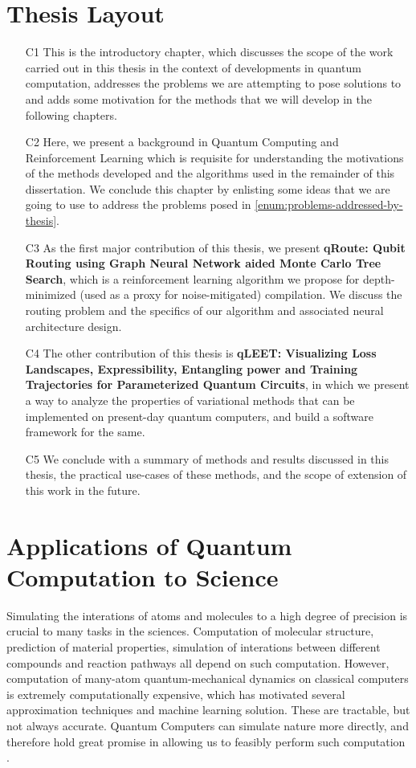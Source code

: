 \section{Thesis Layout}

\begin{itemize}
    \item[C1] This is the introductory chapter, which discusses the scope of the work carried out in this thesis in the context of developments in quantum computation, addresses the problems we are attempting to pose solutions to and adds some motivation for the methods that we will develop in the following chapters.
    \item[C2] Here, we present a background in Quantum Computing and Reinforcement Learning which is requisite for understanding the motivations of the methods developed and the algorithms used in the remainder of this dissertation. We conclude this chapter by enlisting some ideas that we are going to use to address the problems posed in \ref{enum:problems-addressed-by-thesis}.
    \item[C3] As the first major contribution of this thesis, we present \textbf{qRoute: Qubit Routing using Graph Neural Network aided Monte Carlo Tree Search}, which is a reinforcement learning algorithm we propose for depth-minimized (used as a proxy for noise-mitigated) compilation. We discuss the routing problem and the specifics of our algorithm and associated neural architecture design.
    \item[C4] The other contribution of this thesis is \textbf{qLEET: Visualizing Loss Landscapes, Expressibility, Entangling power and Training Trajectories for Parameterized Quantum Circuits}, in which we present a way to analyze the properties of variational methods that can be implemented on present-day quantum computers, and build a software framework for the same.
    \item[C5] We conclude with a summary of methods and results discussed in this thesis, the practical use-cases of these methods, and the scope of extension of this work in the future.
\end{itemize}


\section{Applications of Quantum Computation to Science}

Simulating the interations of atoms and molecules to a high degree of precision is crucial to many tasks in the sciences. Computation of molecular structure, prediction of material properties, simulation of interations between different compounds and reaction pathways all depend on such computation. However, computation of many-atom quantum-mechanical dynamics on classical computers is extremely computationally expensive, which has motivated several approximation techniques and machine learning solution. These are tractable, but not always accurate. Quantum Computers can simulate nature more directly, and therefore hold great promise in allowing us to feasibly perform such computation \cite{feynman-quantum-simulating-physics,qpf-simulating-chemistry}.

